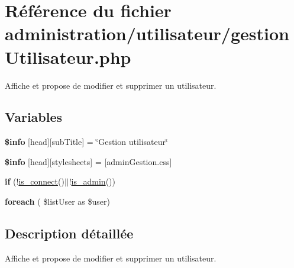 \hypertarget{gestionUtilisateur_8php}{}\section{Référence du fichier administration/utilisateur/gestion\+Utilisateur.php}
\label{gestionUtilisateur_8php}


Affiche et propose de modifier et supprimer un utilisateur.  


\subsection*{Variables}
\begin{DoxyCompactItemize}
\item 
\mbox{\label{gestionUtilisateur_8php_a024f87f9bf4f3b33710e2e7ff8f60823}} 
{\bfseries \$info} \mbox{[}\textquotesingle{}head\textquotesingle{}\mbox{]}\mbox{[}\textquotesingle{}sub\+Title\textquotesingle{}\mbox{]} = \char`\"{}Gestion utilisateur\char`\"{}
\item 
\mbox{\label{gestionUtilisateur_8php_af6044c8bf78ebc8c58057e14d7738bbd}} 
{\bfseries \$info} \mbox{[}\textquotesingle{}head\textquotesingle{}\mbox{]}\mbox{[}\textquotesingle{}stylesheets\textquotesingle{}\mbox{]} = \mbox{[}\textquotesingle{}admin\+Gestion.\+css\textquotesingle{}\mbox{]}
\item 
\mbox{\label{gestionUtilisateur_8php_af06578d46576ae68ff2e0780832fd8a0}} 
{\bfseries if} (!\hyperlink{fonctionCompte_8php_a2fe594e0482307b8729ea37780d6f74b}{is\+\_\+connect}()$\vert$$\vert$!\hyperlink{fonctionCompte_8php_a0b327581800dba50ad70720e23ae2ed2}{is\+\_\+admin}())
\item 
\mbox{\label{gestionUtilisateur_8php_ade552727a1b5ba0d74b99a51cc9d3481}} 
{\bfseries foreach} ( \$list\+User as \$user)
\end{DoxyCompactItemize}


\subsection{Description détaillée}
Affiche et propose de modifier et supprimer un utilisateur. 

